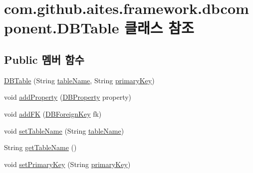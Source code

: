 \hypertarget{classcom_1_1github_1_1aites_1_1framework_1_1dbcomponent_1_1_d_b_table}{}\section{com.\+github.\+aites.\+framework.\+dbcomponent.\+D\+B\+Table 클래스 참조}
\label{classcom_1_1github_1_1aites_1_1framework_1_1dbcomponent_1_1_d_b_table}
\subsection*{Public 멤버 함수}
\begin{DoxyCompactItemize}
\item 
\mbox{\hyperlink{classcom_1_1github_1_1aites_1_1framework_1_1dbcomponent_1_1_d_b_table_a91138e17585ce7ca7009e5525a9f201b}{D\+B\+Table}} (String \mbox{\hyperlink{classcom_1_1github_1_1aites_1_1framework_1_1dbcomponent_1_1_d_b_table_a13baee6ab61eeea3b604d2a7b99b11e7}{table\+Name}}, String \mbox{\hyperlink{classcom_1_1github_1_1aites_1_1framework_1_1dbcomponent_1_1_d_b_table_a2a972d26ced2f37c2e83625617951e2a}{primary\+Key}})
\item 
void \mbox{\hyperlink{classcom_1_1github_1_1aites_1_1framework_1_1dbcomponent_1_1_d_b_table_ae829ac47fea1a1893d62db2ac70e1550}{add\+Property}} (\mbox{\hyperlink{classcom_1_1github_1_1aites_1_1framework_1_1dbcomponent_1_1_d_b_property}{D\+B\+Property}} property)
\item 
void \mbox{\hyperlink{classcom_1_1github_1_1aites_1_1framework_1_1dbcomponent_1_1_d_b_table_a536ae20c4838a81f75f509197bd2bd7c}{add\+FK}} (\mbox{\hyperlink{classcom_1_1github_1_1aites_1_1framework_1_1dbcomponent_1_1_d_b_foreign_key}{D\+B\+Foreign\+Key}} fk)
\item 
void \mbox{\hyperlink{classcom_1_1github_1_1aites_1_1framework_1_1dbcomponent_1_1_d_b_table_a951e8bb16dbac614cede59e99e93aaeb}{set\+Table\+Name}} (String \mbox{\hyperlink{classcom_1_1github_1_1aites_1_1framework_1_1dbcomponent_1_1_d_b_table_a13baee6ab61eeea3b604d2a7b99b11e7}{table\+Name}})
\item 
String \mbox{\hyperlink{classcom_1_1github_1_1aites_1_1framework_1_1dbcomponent_1_1_d_b_table_aa5c66e9bc2059d53ed77e7b71c54e9ef}{get\+Table\+Name}} ()
\item 
void \mbox{\hyperlink{classcom_1_1github_1_1aites_1_1framework_1_1dbcomponent_1_1_d_b_table_aa1f8d83d3a13c5899bb7d30a6d1e99bf}{set\+Primary\+Key}} (String \mbox{\hyperlink{classcom_1_1github_1_1aites_1_1framework_1_1dbcomponent_1_1_d_b_table_a2a972d26ced2f37c2e83625617951e2a}{primary\+Key}})

\end{DoxyCompactItemize}
